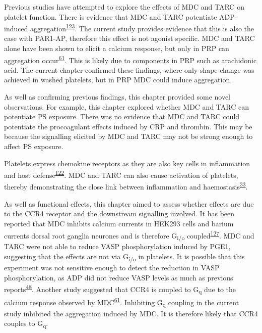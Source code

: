 \documentclass[11pt,twoside]{bristolthesis}
\begin{document}
Previous studies have attempted to explore the effects of MDC and TARC on platelet function. There is evidence that MDC and TARC potentiate ADP-induced aggregation\textsuperscript{\protect\hyperlink{ref-Gear2001}{123}}. The current study provides evidence that this is also the case with PAR1-AP, therefore this effect is not agonist specific. MDC and TARC alone have been shown to elicit a calcium response, but only in PRP can aggregation occur\textsuperscript{\protect\hyperlink{ref-Kowalska2000}{61}}. This is likely due to components in PRP such as arachidonic acid. The current chapter confirmed these findings, where only shape change was achieved in washed platelets, but in PRP MDC could induce aggregation.

As well as confirming previous findings, this chapter provided some novel observations. For example, this chapter explored whether MDC and TARC can potentiate PS exposure. There was no evidence that MDC and TARC could potentiate the procoagulant effects induced by CRP and thrombin. This may be because the signalling elicited by MDC and TARC may not be strong enough to affect PS exposure.

Platelets express chemokine receptors as they are also key cells in inflammation and host defense\textsuperscript{\protect\hyperlink{ref-Clemetson2000}{122}}. MDC and TARC can also cause activation of platelets, thereby demonstrating the close link between inflammation and haemostasis\textsuperscript{\protect\hyperlink{ref-Gear2003}{33}}.

As well as functional effects, this chapter aimed to assess whether effects are due to the CCR4 receptor and the downstream signalling involved. It has been reported that MDC inhibits calcium currents in HEK293 cells and barium currents dorsal root ganglia neurones and is therefore G\textsubscript{i/o} coupled\textsuperscript{\protect\hyperlink{ref-Oh2002}{127}}. MDC and TARC were not able to reduce VASP phosphorylation induced by PGE1, suggesting that the effects are not via G\textsubscript{i/o} in platelets. It is possible that this experiment was not sensitive enough to detect the reduction in VASP phosphorylation, as ADP did not reduce VASP levels as much as previous reports\textsuperscript{\protect\hyperlink{ref-Hezard2005}{48}}. Another study suggested that CCR4 is coupled to G\textsubscript{q} due to the calcium response observed by MDC\textsuperscript{\protect\hyperlink{ref-Kowalska2000}{61}}. Inhibiting G\textsubscript{q} coupling in the current study inhibited the aggregation induced by MDC. It is therefore likely that CCR4 couples to G\textsubscript{q}.
\end{document}

